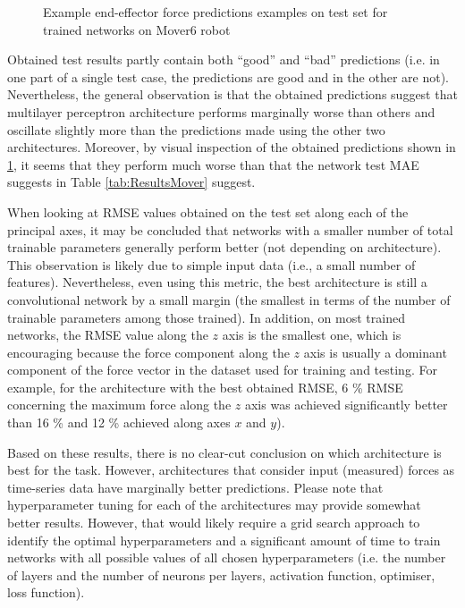 \begin{figure}
    \hfil
    \caption{Example end-effector force predictions examples on test set for trained networks on Mover6 robot}
    \label{fig:Graphs}
\end{figure}

Obtained test results partly contain both ``good'' and ``bad'' predictions (i.e. in one part of a single test case, the predictions are good and in the other are not). Nevertheless, the general observation is that the obtained predictions suggest that multilayer perceptron architecture performs marginally worse than others and oscillate slightly more than the predictions made using the other two architectures. Moreover, by visual inspection of the obtained predictions shown in \cref{fig:Graphs}, it seems that they perform much worse than that the network test MAE suggests in Table \ref{tab:ResultsMover} suggest.

When looking at RMSE values obtained on the test set along each of the principal axes, it may be concluded that networks with a smaller number of total trainable parameters generally perform better (not depending on architecture). This observation is likely due to simple input data (i.e., a small number of features). Nevertheless, even using this metric, the best architecture is still a convolutional network by a small margin (the smallest in terms of the number of trainable parameters among those trained). In addition, on most trained networks, the RMSE value along the $z$ axis is the smallest one, which is encouraging because the force component along the $z$ axis is usually a dominant component of the force vector in the dataset used for training and testing. For example, for the architecture with the best obtained RMSE, 6 \% RMSE concerning the maximum force along the $z$ axis was achieved significantly better than 16 \% and 12 \% achieved along axes $x$ and $y$).

Based on these results, there is no clear-cut conclusion on which architecture is best for the task. However, architectures that consider input (measured) forces as time-series data have marginally better predictions. Please note that hyperparameter tuning for each of the architectures may provide somewhat better results. However, that would likely require a grid search approach to identify the optimal hyperparameters and a significant amount of time to train networks with all possible values of all chosen hyperparameters (i.e. the number of layers and the number of neurons per layers, activation function, optimiser, loss function).

